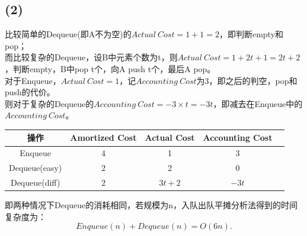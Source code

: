 \documentclass[11pt]{ctexart}
\begin{document}
	\subsection*{(2)}
	比较简单的Dequeue(即A不为空)的$Actual\ Cost=1+1=2$，即判断empty和pop；\\
	\hspace*{20pt}而比较复杂的Dequeue，设B中元素个数为t，则$Actual\ Cost=1+2t+1=2t+2$，判断empty，B中pop t个，向A push t个，最后A pop。\\
	\hspace*{20pt}对于Enqueue，$Actual\ Cost=1$，记$Accounting\ Cost$为3，即之后的判空，pop和push的代价。\\
	\hspace*{20pt}则对于复杂的Dequeue的$Accounting\ Cost=-3\times t=-3t$，即减去在Enqueue中的$Accounting\ Cost$。\\
	\begin{table}[h]
	
		\begin{tabular}{|c|c|c|c|c}
			\hline
			\textbf{操作}& \textbf{Amortized Cost} & \textbf{Actual Cost} & \textbf{Accounting Cost}\\
			\hline
			Enqueue & $4$ & 1 & $3$ \\
			\hline
			Dequeue(easy) & $2$ & 2 & $0$ \\
			\hline
			Dequeue(diff) & $2$ & $3t+2$ & $-3t$ \\
			\hline
		\end{tabular}
\end{table}
	\par 即两种情况下Dequeue的消耗相同，若规模为n，入队出队平摊分析法得到的时间复杂度为：
	$$Enqueue(n)+Dequeue(n)=O(6n).$$
\end{document}
